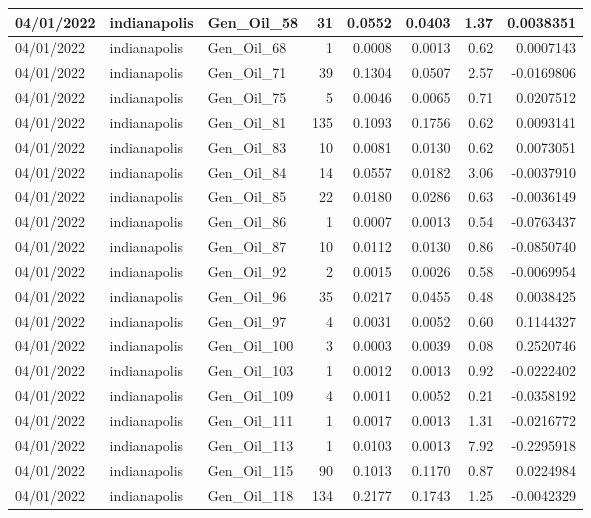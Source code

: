 \documentclass[
  letterpaper,
  DIV=11,
  numbers=noendperiod]{scrartcl}
\begin{document}
\begin{tabular}{l|l|l|r|r|r|r|r}
\hline
04/01/2022 & indianapolis & Gen\_Oil\_58 & 31 & 0.0552 & 0.0403 & 1.37 & 0.0038351\\
\hline
04/01/2022 & indianapolis & Gen\_Oil\_68 & 1 & 0.0008 & 0.0013 & 0.62 & 0.0007143\\
\hline
04/01/2022 & indianapolis & Gen\_Oil\_71 & 39 & 0.1304 & 0.0507 & 2.57 & -0.0169806\\
\hline
04/01/2022 & indianapolis & Gen\_Oil\_75 & 5 & 0.0046 & 0.0065 & 0.71 & 0.0207512\\
\hline
04/01/2022 & indianapolis & Gen\_Oil\_81 & 135 & 0.1093 & 0.1756 & 0.62 & 0.0093141\\
\hline
04/01/2022 & indianapolis & Gen\_Oil\_83 & 10 & 0.0081 & 0.0130 & 0.62 & 0.0073051\\
\hline
04/01/2022 & indianapolis & Gen\_Oil\_84 & 14 & 0.0557 & 0.0182 & 3.06 & -0.0037910\\
\hline
04/01/2022 & indianapolis & Gen\_Oil\_85 & 22 & 0.0180 & 0.0286 & 0.63 & -0.0036149\\
\hline
04/01/2022 & indianapolis & Gen\_Oil\_86 & 1 & 0.0007 & 0.0013 & 0.54 & -0.0763437\\
\hline
04/01/2022 & indianapolis & Gen\_Oil\_87 & 10 & 0.0112 & 0.0130 & 0.86 & -0.0850740\\
\hline
04/01/2022 & indianapolis & Gen\_Oil\_92 & 2 & 0.0015 & 0.0026 & 0.58 & -0.0069954\\
\hline
04/01/2022 & indianapolis & Gen\_Oil\_96 & 35 & 0.0217 & 0.0455 & 0.48 & 0.0038425\\
\hline
04/01/2022 & indianapolis & Gen\_Oil\_97 & 4 & 0.0031 & 0.0052 & 0.60 & 0.1144327\\
\hline
04/01/2022 & indianapolis & Gen\_Oil\_100 & 3 & 0.0003 & 0.0039 & 0.08 & 0.2520746\\
\hline
04/01/2022 & indianapolis & Gen\_Oil\_103 & 1 & 0.0012 & 0.0013 & 0.92 & -0.0222402\\
\hline
04/01/2022 & indianapolis & Gen\_Oil\_109 & 4 & 0.0011 & 0.0052 & 0.21 & -0.0358192\\
\hline
04/01/2022 & indianapolis & Gen\_Oil\_111 & 1 & 0.0017 & 0.0013 & 1.31 & -0.0216772\\
\hline
04/01/2022 & indianapolis & Gen\_Oil\_113 & 1 & 0.0103 & 0.0013 & 7.92 & -0.2295918\\
\hline
04/01/2022 & indianapolis & Gen\_Oil\_115 & 90 & 0.1013 & 0.1170 & 0.87 & 0.0224984\\
\hline
04/01/2022 & indianapolis & Gen\_Oil\_118 & 134 & 0.2177 & 0.1743 & 1.25 & -0.0042329\\

\end{tabular}
\end{document}
